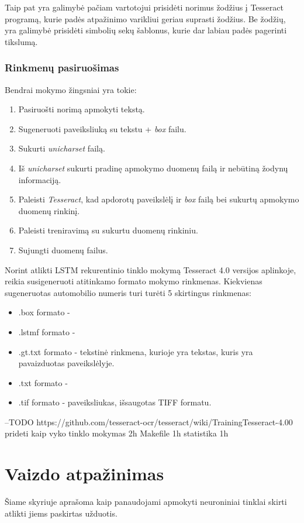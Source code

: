 \documentclass{VUMIFInfBakalaurinis}
\begin{document}
Taip pat yra galimybė pačiam vartotojui prisidėti norimus žodžius į Tesseract programą, kurie padės atpažinimo varikliui geriau suprasti žodžius.
Be žodžių, yra galimybė prisidėti simbolių sekų šablonus, kurie dar labiau padės pagerinti tikslumą.

\subsubsection{Rinkmenų pasiruošimas}
Bendrai mokymo žingsniai yra tokie:

\begin{enumerate}
  \item Pasiruošti norimą apmokyti tekstą.
  \item Sugeneruoti paveiksliuką su tekstu + \textit{box} failu.
  \item Sukurti \textit{unicharset} failą.
  \item Iš \textit{unicharset} sukurti pradinę apmokymo duomenų failą ir nebūtiną žodynų informaciją. 
  \item Paleisti \textit{Tesseract}, kad apdorotų paveikslėlį ir \textit{box} failą bei sukurtų apmokymo duomenų rinkinį.
  \item Paleisti treniravimą su sukurtu duomenų rinkiniu.
  \item Sujungti duomenų failus.
\end{enumerate}

Norint atlikti LSTM rekurentinio tinklo mokymą Tesseract 4.0 versijos aplinkoje, reikia susigeneruoti atitinkamo formato mokymo rinkmenas.
Kiekvienas sugeneruotas automobilio numeris turi turėti 5 skirtingus rinkmenas:
\begin{itemize}
  \item .box formato - 
  \item .lstmf formato - 
  \item .gt.txt formato - tekstinė rinkmena, kurioje yra tekstas, kuris yra pavaizduotas paveikslėlyje.
  \item .txt formato - 
  \item .tif formato - paveiksliukas, išsaugotas TIFF formatu.
\end{itemize}




--TODO
https://github.com/tesseract-ocr/tesseract/wiki/TrainingTesseract-4.00
prideti kaip vyko tinklo mokymas 2h
Makefile 1h
statistika 1h





\pagebreak
\section{Vaizdo atpažinimas}
Šiame skyriuje aprašoma kaip panaudojami apmokyti neuroniniai tinklai skirti atlikti jiems paskirtas užduotis.
\end{document}
